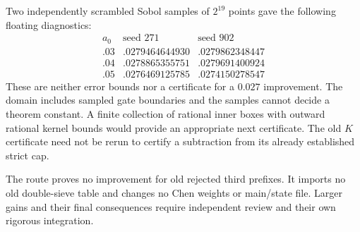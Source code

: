 Two independently scrambled Sobol samples of \(2^{19}\) points
gave the following floating diagnostics:
\[
\begin{array}{c|cc}
 a_0 & \text{seed }271 & \text{seed }902\\ \hline
 .03&.0279464644930&.0279862348447\\
 .04&.0278865355751&.0279691400924\\
 .05&.0276469125785&.0274150278547
\end{array}
\]
These are neither error bounds nor a certificate for a \(0.027\)
improvement. The domain includes sampled gate boundaries and the
samples cannot decide a theorem constant.
A finite collection of rational inner boxes with outward rational
kernel bounds would provide an appropriate next certificate.
The old \(K\) certificate need not be rerun to certify a subtraction
from its already established strict cap.

The route proves no improvement for old rejected third prefixes.
It imports no old double-sieve table and changes no Chen weights
or main/state file. Larger gains and their final consequences
require independent review and their own rigorous integration.
